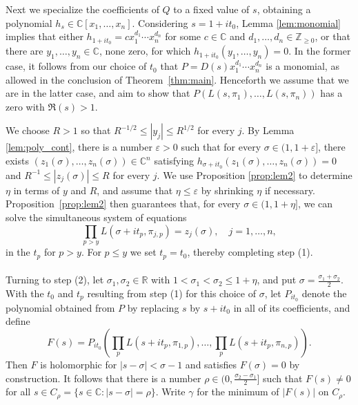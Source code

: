\documentclass[11pt]{amsart}
\theoremstyle{remark}
\numberwithin{theorem}{section}
\numberwithin{equation}{section}
\newcommand{\R}{\mathbb{R}}
\newcommand{\C}{\mathbb{C}}
\newcommand{\Z}{\mathbb{Z}}
\begin{document}
Next we 
specialize the coefficients of $Q$ to a fixed value of $s$, obtaining
a polynomial $h_s\in\C[x_1,\dots,x_n]$. Considering $s=1+it_0$, Lemma \ref{lem:monomial}
implies that either $h_{1+it_0}=cx_1^{d_1}\cdots x_n^{d_n}$
for some $c\in\C$
and $d_1,\ldots,d_n\in\Z_{\ge0}$, or that there are $y_1,\ldots,y_n\in\C$,
none zero, for which $h_{1+it_0}(y_1,\ldots,y_n)=0$.
In the former case, it follows from our choice of $t_0$ that
$P=D(s)x_1^{d_1}\cdots x_n^{d_n}$ is a monomial, as allowed in the
conclusion of Theorem~\ref{thm:main}.
Henceforth we assume that we are in the latter case,
and aim to show that $P(L(s,\pi_1),\ldots,L(s,\pi_n))$
has a zero with $\Re(s)>1$.

We choose $R>1$ so that $R^{-{1/2}}\leq|y_j|\leq R^{1/2}$ for
every $j$.  By Lemma \ref{lem:poly_cont}, there is a number
$\varepsilon>0$ such that for every $\sigma\in(1,1+\varepsilon]$,
there exists $(z_1(\sigma),\ldots,z_n(\sigma))\in\C^n$
satisfying $h_{\sigma+it_0}(z_1(\sigma),\ldots,z_n(\sigma))=0$
and $R^{-1}\leq|z_j(\sigma)|\leq R$ for every $j$.  We use
Proposition \ref{prop:lem2} to determine $\eta$ in terms of
$y$ and $R$, and assume that $\eta \le \varepsilon$
by shrinking $\eta$ if necessary.
Proposition~\ref{prop:lem2} then guarantees that, for every
$\sigma\in(1,1+\eta]$, we can solve the
simultaneous system of equations
$$
\prod_{p>y}L(\sigma+it_p,\pi_{j,p})=z_j(\sigma),\quad j=1,\ldots,n,
$$
in the $t_p$ for $p>y$. For $p\le y$ we set $t_p=t_0$, thereby
completing step (1).
\\
\\
Turning to step (2), let $\sigma_1,\sigma_2\in\R$ with
$1<\sigma_1<\sigma_2\le1+\eta$, and put $\sigma=\frac{\sigma_1+\sigma_2}2$.
With the $t_0$ and $t_p$ resulting from step (1) for this choice of $\sigma$,
let $P_{it_0}$ denote the polynomial obtained from $P$ by replacing $s$
by $s+it_0$ in all of its coefficients, and define
\begin{equation}\label{eqn:Fdef}
F(s)=P_{it_0}\!\left(
\prod_pL(s+it_p,\pi_{1,p}),\ldots,\prod_pL(s+it_p,\pi_{n,p})\right).
\end{equation}
Then $F$ is holomorphic for $|s-\sigma|<\sigma-1$ and satisfies
$F(\sigma)=0$ by construction. It follows that there
is a number $\rho\in(0,\frac{\sigma_2-\sigma_1}2]$ such that
$F(s)\neq0$ for all $s\in C_\rho=\{s\in\C:|s-\sigma|=\rho\}$.
Write $\gamma$ for the minimum of $|F(s)|$ on $C_\rho$.
\end{document}
